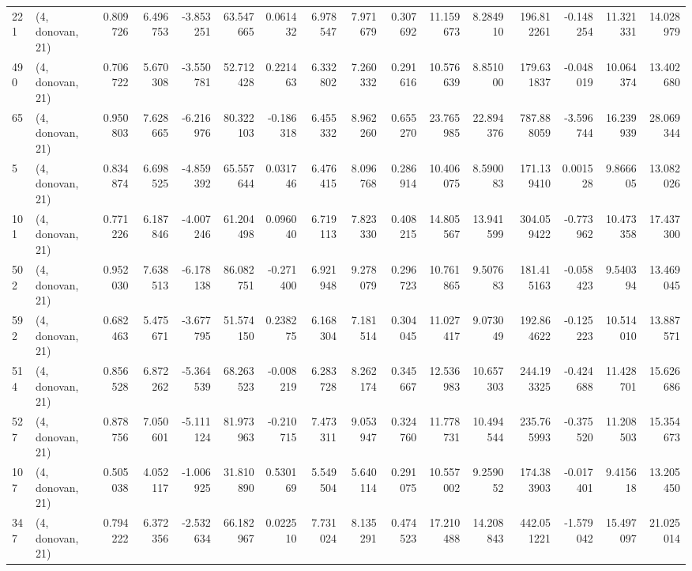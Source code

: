 \begin{tabular}{llrrrrrrrrrrrrrr}
221 &  (4, donovan, 21) &   0.809726 &   6.496753 &  -3.853251 &    63.547665 &   0.061432 &   6.978547 &   7.971679 &  0.307692 &  11.159673 &   8.284910 &    196.812261 &  -0.148254 &  11.321331 &   14.028979 \\
490 &  (4, donovan, 21) &   0.706722 &   5.670308 &  -3.550781 &    52.712428 &   0.221463 &   6.332802 &   7.260332 &  0.291616 &  10.576639 &   8.851000 &    179.631837 &  -0.048019 &  10.064374 &   13.402680 \\
65  &  (4, donovan, 21) &   0.950803 &   7.628665 &  -6.216976 &    80.322103 &  -0.186318 &   6.455332 &   8.962260 &  0.655270 &  23.765985 &  22.894376 &    787.888059 &  -3.596744 &  16.239939 &   28.069344 \\
5   &  (4, donovan, 21) &   0.834874 &   6.698525 &  -4.859392 &    65.557644 &   0.031746 &   6.476415 &   8.096768 &  0.286914 &  10.406075 &   8.590083 &    171.139410 &   0.001528 &   9.866605 &   13.082026 \\
101 &  (4, donovan, 21) &   0.771226 &   6.187846 &  -4.007246 &    61.204498 &   0.096040 &   6.719113 &   7.823330 &  0.408215 &  14.805567 &  13.941599 &    304.059422 &  -0.773962 &  10.473358 &   17.437300 \\
502 &  (4, donovan, 21) &   0.952030 &   7.638513 &  -6.178138 &    86.082751 &  -0.271400 &   6.921948 &   9.278079 &  0.296723 &  10.761865 &   9.507683 &    181.415163 &  -0.058423 &   9.540394 &   13.469045 \\
592 &  (4, donovan, 21) &   0.682463 &   5.475671 &  -3.677795 &    51.574150 &   0.238275 &   6.168304 &   7.181514 &  0.304045 &  11.027417 &   9.073049 &    192.864622 &  -0.125223 &  10.514010 &   13.887571 \\
514 &  (4, donovan, 21) &   0.856528 &   6.872262 &  -5.364539 &    68.263523 &  -0.008219 &   6.283728 &   8.262174 &  0.345667 &  12.536983 &  10.657303 &    244.193325 &  -0.424688 &  11.428701 &   15.626686 \\
527 &  (4, donovan, 21) &   0.878756 &   7.050601 &  -5.111124 &    81.973963 &  -0.210715 &   7.473311 &   9.053947 &  0.324760 &  11.778731 &  10.494544 &    235.765993 &  -0.375520 &  11.208503 &   15.354673 \\
107 &  (4, donovan, 21) &   0.505038 &   4.052117 &  -1.006925 &    31.810890 &   0.530169 &   5.549504 &   5.640114 &  0.291075 &  10.557002 &   9.259052 &    174.383903 &  -0.017401 &   9.415618 &   13.205450 \\
347 &  (4, donovan, 21) &   0.794222 &   6.372356 &  -2.532634 &    66.182967 &   0.022510 &   7.731024 &   8.135291 &  0.474523 &  17.210488 &  14.208843 &    442.051221 &  -1.579042 &  15.497097 &   21.025014 \\

\end{tabular}
